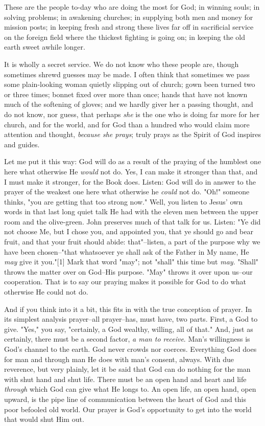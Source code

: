 These are the people to-day who are doing the most for God; in winning
souls; in solving problems; in awakening churches; in supplying both men
and money for mission posts; in keeping fresh and strong these lives far
off in sacrificial service on the foreign field where the thickest
fighting is going on; in keeping the old earth sweet awhile longer.

It is wholly a secret service. We do not know who these people are, though
sometimes shrewd guesses may be made. I often think that sometimes we pass
some plain-looking woman quietly slipping out of church; gown been turned
two or three times; bonnet fixed over more than once; hands that have not
known much of the softening of gloves; and we hardly giver her a passing
thought, and do not know, nor guess, that perhaps \textit{she} is the one who is
doing far more for her church, and for the world, and for God than a
hundred who would claim more attention and thought, \textit{because she prays};
truly prays as the Spirit of God inspires and guides.

Let me put it this way: God will do as a result of the praying of the
humblest one here what otherwise He \textit{would} not do. Yes, I can make it
stronger than that, and I must make it stronger, for the Book does.
Listen: God will do in answer to the prayer of the weakest one here what
otherwise he \textit{could} not do. "Oh!" someone thinks, "you are getting that
too strong now." Well, you listen to Jesus' own words in that last long
quiet talk He had with the eleven men between the upper room and the
olive-green. John preserves much of that talk for us. Listen: "Ye did not
choose Me, but I chose you, and appointed you, that ye should go and bear
fruit, and that your fruit should abide: that"--listen, a part of the
purpose why we have been chosen--"that whatsoever ye shall ask of the
Father in My name, He \textit{may} give it you."[1] Mark that word "may"; not
"shall" this time but \textit{may}. "Shall" throws the matter over on God--His
purpose. "May" throws it over upon us--our cooperation. That is to say our
praying makes it possible for God to do what otherwise He could not do.

And if you think into it a bit, this fits in with the true conception of
prayer. In its simplest analysis prayer--all prayer--has, must have, two
parts. First, a God to give. "Yes," you say, "certainly, a God wealthy,
willing, all of that." And, just as certainly, there must be a second
factor, \textit{a man to receive}. Man's willingness is God's channel to the
earth. God never crowds nor coerces. Everything God does for man and
through man He does with man's consent, always. With due reverence, but
very plainly, let it be said that God can do nothing for the man with shut
hand and shut life. There must be an open hand and heart and life
\textit{through} which God can give what He longs to. An open life, an open hand,
open upward, is the pipe line of communication between the heart of God
and this poor befooled old world. Our prayer is God's opportunity to get
into the world that would shut Him out.



